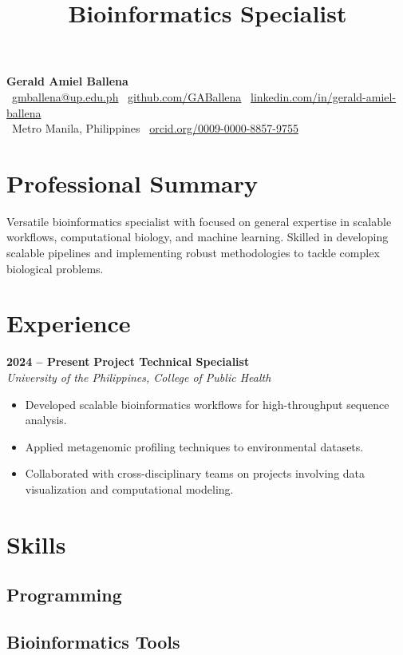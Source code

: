 \documentclass[11pt,a4paper,sans]{moderncv}
\title{Bioinformatics Specialist}
\makeatletter
\renewcommand{\makecvtitle}{
	\vspace*{-2em}
	\begin{center}
		{\Huge \textbf{Gerald Amiel Ballena}} \\[0.5em]
		\faEnvelope \ \href{mailto:gmballena@up.edu.ph}{gmballena@up.edu.ph} \quad
		\faGithub \ \href{https://github.com/GABallena}{github.com/GABallena} \quad
		\faLinkedin \ \href{https://linkedin.com/in/gerald-amiel-ballena}{linkedin.com/in/gerald-amiel-ballena} \\[0.5em]
		\faMapMarker \ Metro Manila, Philippines \quad
		\aiOrcid \ \href{https://orcid.org/0009-0000-8857-9755}{orcid.org/0009-0000-8857-9755}
	\end{center}
	\vspace{1.5em}
}
\makeatother
\begin{document}
	
	\makecvtitle
	
\section{Professional Summary}
Versatile bioinformatics specialist with  focused on general expertise in scalable workflows, computational biology, and machine learning. Skilled in developing scalable pipelines and implementing robust methodologies to tackle complex biological problems.



\section{Experience}
\textbf{2024 – Present} \hfill \textbf{Project Technical Specialist} \\
\textit{University of the Philippines, College of Public Health} \\[-1em]
\begin{itemize}
	\item Developed scalable bioinformatics workflows for high-throughput sequence analysis.
	\item Applied metagenomic profiling techniques to environmental datasets.
	\item Collaborated with cross-disciplinary teams on projects involving data visualization and computational modeling.
\end{itemize}



\section{Skills}

\subsection{Programming}

\subsection{Bioinformatics Tools}
\end{document}
